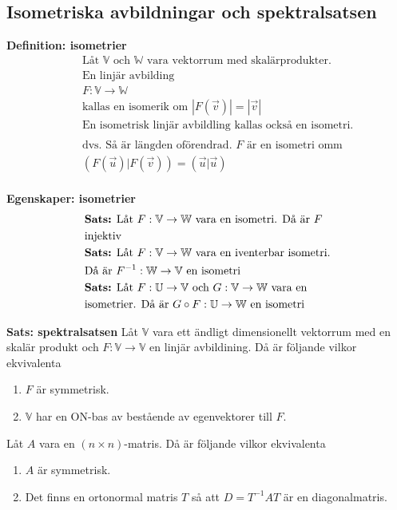 \begin{multicols}{2}
\section{Isometriska avbildningar och spektralsatsen}
\textbf{Definition: isometrier}
\begin{align*}
  &\quad  \text{Låt $\mathbb{V}$ och $\mathbb{W}$ vara vektorrum med skalärprodukter. } \\
  &\quad  \text{En linjär avbilding} \\
  &\quad  F:\mathbb{V}\to\mathbb{W} \\
  &\quad  \text{kallas en isomerik om } |F(\vec{v})| = |\vec{v}| \\
  &\quad  \text{En isometrisk linjär avbildling kallas också en isometri.} \\
  &\quad  \\
  &\quad  \text{dvs. Så är längden oförendrad. $F$ är en isometri omm } \\
  &\quad  (F(\vec{u})|F(\vec{v})) = (\vec{u}|\vec{u}) \\
\end{align*}

\textbf{Egenskaper: isometrier}
\begin{align*}
  &\text{\textbf{Sats:} Låt $F:\mathbb{V}\to\mathbb{W}$ vara en isometri. Då är $F$} \\
  &\text{injektiv} \\
  &\text{\textbf{Sats:} Låt $F:\mathbb{V}\to\mathbb{W}$ vara en iventerbar isometri.} \\
  &\text{Då är $F^{-1}:\mathbb{W}\to\mathbb{V}$ en isometri} \\
  &\text{\textbf{Sats:} Låt $F:\mathbb{U}\to\mathbb{V}$ och $G:\mathbb{V}\to\mathbb{W}$ vara en} \\
  &\text{isometrier. Då är $G\circ{F}:\mathbb{U}\to\mathbb{W}$ en isometri} \\
\end{align*}

\textbf{Sats: spektralsatsen}
Låt $\mathbb{V}$ vara ett ändligt dimensionellt vektorrum med en
skalär produkt och $F:\mathbb{V}\to\mathbb{V}$ en linjär avbildining.
Då är följande vilkor ekvivalenta
\begin{enumerate}
  \item $F$ är symmetrisk.
  \item $\mathbb{V}$ har en ON-bas av bestående av egenvektorer till $F$.
\end{enumerate}

Låt $A$ vara en $(n\times{n})$-matris. Då är följande vilkor ekvivalenta
\begin{enumerate}
  \item $A$ är symmetrisk.
  \item Det finns en ortonormal matris $T$ så att $D=T^{-1}AT$ är en diagonalmatris.
\end{enumerate}



\end{multicols}
